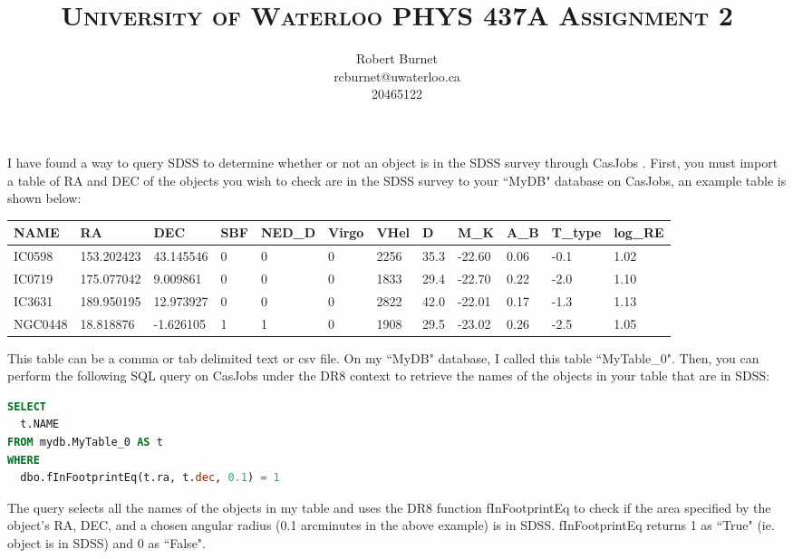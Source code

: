 \documentclass[10pt,letterpaper]{article}
\begin{document}
\title{\scshape\LARGE University of Waterloo \vfill \huge\bfseries PHYS 437A Assignment 2 \vfill}
\author{Robert Burnet \\ rcburnet@uwaterloo.ca \\ 20465122 }
\maketitle

\newpage
I have found a way to query SDSS to determine whether or not an object is in the SDSS survey through CasJobs \cite{casjobs}. First, you must import a table of RA and DEC of the objects you wish to check are in the SDSS survey to your ``MyDB" database on CasJobs, an example table is shown below:\\

\begin{table}[h!]
\footnotesize
\begin{tabular}{|l|l|l|l|l|l|l|l|l|l|l|l|}
NAME & RA & DEC & SBF & NED\_D & Virgo & VHel & D & M\_K & A\_B & T\_type & log\_RE \\
\hline
IC0598 & 153.202423 & 43.145546 & 0 & 0 & 0 & 2256 & 35.3 & -22.60 & 0.06 & -0.1 & 1.02\\
IC0719 & 175.077042 & 9.009861 & 0 & 0 & 0 & 1833 & 29.4 & -22.70 & 0.22 & -2.0 & 1.10\\
IC3631 & 189.950195 & 12.973927 & 0 & 0 & 0 & 2822 & 42.0 & -22.01 & 0.17 & -1.3 & 1.13\\
NGC0448 & 18.818876 & -1.626105 & 1 & 1 & 0 & 1908 & 29.5 & -23.02 & 0.26 & -2.5 & 1.05\\
\end{tabular}
\end{table}

This table can be a comma or tab delimited text or csv file. On my ``MyDB" database, I called this table ``MyTable\_0". Then, you can perform the following SQL query on CasJobs under the DR8 context to retrieve the names of the objects in your table that are in SDSS:\\

\begin{lstlisting}[language=SQL]
SELECT 
  t.NAME
FROM mydb.MyTable_0 AS t 
WHERE 
  dbo.fInFootprintEq(t.ra, t.dec, 0.1) = 1
\end{lstlisting}

The query selects all the names of the objects in my table and uses the DR8 function fInFootprintEq to check if the area specified by the object's RA, DEC, and a chosen angular radius (0.1 arcminutes in the above example) is in SDSS. fInFootprintEq returns 1 as ``True" (ie. object is in SDSS) and 0 as ``False". \\
\end{document}
